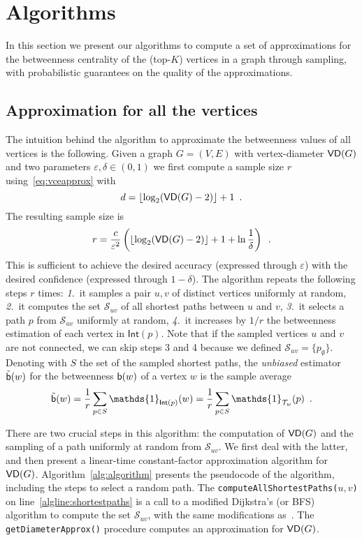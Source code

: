 \section{Algorithms}\label{sec:algo}
In this section we present our algorithms to compute a set of approximations for the
betweenness centrality of the (top-$K$) vertices in a graph through sampling,
with probabilistic guarantees on the quality of the approximations.

\subsection{Approximation for all the vertices}\label{sec:allvertapprox}
The intuition behind the algorithm to approximate the betweenness values of all
vertices is the following. Given a graph $G=(V,E)$
with vertex-diameter $\mathsf{VD}(G)$ and two parameters $\varepsilon,\delta\in(0,1)$
we first compute a sample size $r$ using~\eqref{eq:vceapprox} with
\[d=\lfloor\log_2(\mathsf{VD}(G)-2)\rfloor+1\enspace.\]
The resulting sample size is
\begin{equation}\label{eq:samplesize}
r=\frac{c}{\varepsilon^2}\left(\lfloor\log_2(\VD(G)-2)\rfloor+1+\ln\frac{1}{\delta}\right)\enspace.
\end{equation}
This is sufficient to achieve the desired accuracy
(expressed through $\varepsilon$) with the desired confidence (expressed through
$1-\delta$). The algorithm repeats the following steps $r$ times:
\emph{1.}~it samples a pair $u,v$ of distinct vertices uniformly at random,
\emph{2.}~it
computes the set $\mathcal{S}_{uv}$ of all shortest paths between $u$ and $v$,
\emph{3.}~it selects a path $p$ from $\mathcal{S}_{uv}$ uniformly at random,
\emph{4.}~it increases by $1/r$ the betweenness estimation of each vertex in
$\mathsf{Int}(p)$. Note that if the sampled vertices $u$ and $v$ are not
connected, we can skip steps 3 and 4 because we defined
$\mathcal{S}_{uv}=\{p_\emptyset\}$. Denoting with $S$ the set of the sampled
shortest paths, the \emph{unbiased} estimator $\tilde{\mathsf{b}}(w)$ for the betweenness
$\mathsf{b}(w)$ of a vertex $w$ is the sample average 
\[
\tilde\betw(w) = \frac{1}{r}\sum_{p\in S}
\mathds{1}_{\mathsf{Int}(p)}(w) = \frac{1}{r}\sum_{p\in S}
\mathds{1}_{\mathcal{T}_w}(p)\enspace.
\]

There are two crucial steps in this algorithm: the computation of $\mathsf{VD}(G)$ and
the sampling of a path uniformly at random from $\mathcal{S}_{uv}$. We first
deal with the latter, and then present a linear-time constant-factor approximation algorithm for $\mathsf{VD}(G)$.
Algorithm~\ref{alg:algorithm} presents the pseudocode of the algorithm,
including the steps to select a random path.  The
\texttt{computeAllShortestPaths(}$u,v$\texttt{)}  on
line~\ref{algline:shortestpaths} is a call to a modified Dijkstra's (or BFS)
algorithm to compute the set $\mathcal{S}_{uv}$, with the same modifications
as~\citep{Brandes01}. The \texttt{getDiameterApprox()} procedure computes an approximation for $\mathsf{VD}(G)$. %

